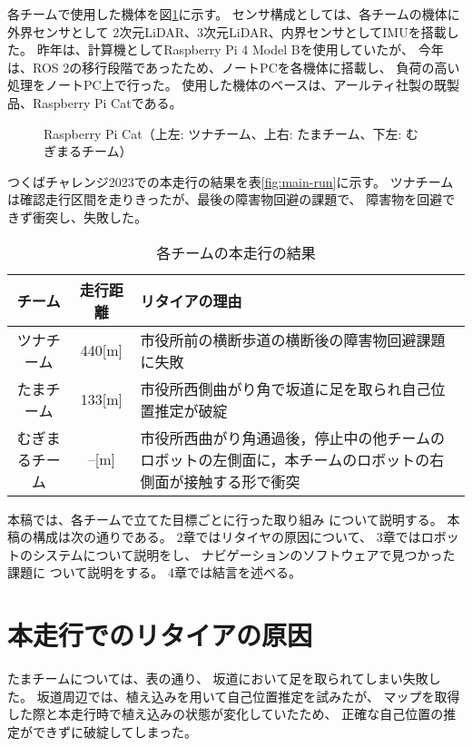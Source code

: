 \documentclass[twocolumn,9pt]{jsproceedings}
\begin{document}
各チームで使用した機体を図\ref{fig:raspicat}に示す。
センサ構成としては、各チームの機体に外界センサとして
2次元LiDAR、3次元LiDAR、内界センサとしてIMUを搭載した。
昨年は、計算機としてRaspberry Pi 4 Model Bを使用していたが、
今年は、ROS 2の移行段階であったため、ノートPCを各機体に搭載し、
負荷の高い処理をノートPC上で行った。
使用した機体のベースは、アールティ社製の既製品、Raspberry Pi Catである。

\begin{figure}[h]
 	\begin{center}
 		\caption{Raspberry Pi Cat（上左: ツナチーム、上右: たまチーム、下左: むぎまるチーム）}
 		\label{fig:raspicat}
 	\end{center}
\end{figure}

つくばチャレンジ2023での本走行の結果を表\ref{fig:main-run}に示す。
ツナチームは確認走行区間を走りきったが、最後の障害物回避の課題で、
障害物を回避できず衝突し、失敗した。

\begin{table}[h]
  \caption{各チームの本走行の結果}
  \label{MainRun}
	\begin{tabular}{|c|c|p{5.4cm}|}
    \hline
	チーム & 走行距離 & リタイアの理由 \\
    \hline
  ツナチーム & 440[m] & 市役所前の横断歩道の横断後の障害物回避課題に失敗\\
    \hline
  たまチーム & 133[m] & 市役所西側曲がり角で坂道に足を取られ自己位置推定が破綻\\
    \hline
  むぎまるチーム & --[m] & 市役所西曲がり角通過後，停止中の他チームのロボットの左側面に，本チームのロボットの右側面が接触する形で衝突\\
    \hline
  \end{tabular}
\end{table}

本稿では、各チームで立てた目標ごとに行った取り組み
について説明する。
本稿の構成は次の通りである。 
2章ではリタイヤの原因について、
3章ではロボットのシステムについて説明をし、
ナビゲーションのソフトウェアで見つかった課題に
ついて説明をする。 
4章では結言を述べる。

\section{本走行でのリタイアの原因}

たまチームについては、表の通り、
坂道において足を取られてしまい失敗した。
坂道周辺では、植え込みを用いて自己位置推定を試みたが、
マップを取得した際と本走行時で植え込みの状態が変化していたため、
正確な自己位置の推定ができずに破綻してしまった。
\end{document}
